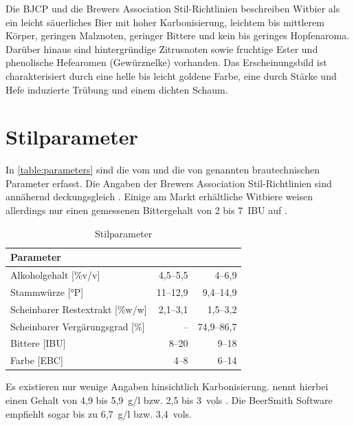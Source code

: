 \documentclass[a4paper,parskip=half]{scrartcl}
\begin{document}
Die BJCP und die Brewers Association Stil-Richtlinien beschreiben
Witbier als ein leicht säuerliches Bier mit hoher Karbonisierung,
leichtem bis mittlerem Körper, geringen Malznoten, geringer Bittere
und kein bis geringes Hopfenaroma. Darüber hinaus sind hintergründige
Zitrusnoten sowie fruchtige Ester und phenolische Hefearomen (Gewürznelke)
vorhanden. Das Erscheinungsbild ist charakterisiert durch eine helle
bis leicht goldene Farbe, eine durch Stärke und Hefe induzierte Trübung
und einem dichten Schaum. \parencites[48\psq]{BJCP2015}[24]{BA2021}

\section*{Stilparameter}

In \autoref{table:parameters} sind die vom \citeauthor{BJCP2015} und die von
\citeauthor{Strottner1999} genannten brautechnischen Parameter erfasst.
Die Angaben der Brewers Association Stil-Richtlinien sind annähernd
deckungsgleich \parencites[24]{BA2021}. Einige am Markt erhältliche
Witbiere weisen allerdings nur einen gemessenen Bittergehalt von
2 bis 7~IBU auf \parencite[96-121]{Roncoroni2018}.

\begin{table}[H]
\centering
\begin{tabular}{lrr}
\toprule
Parameter                       & \citeauthor{BJCP2015} & \citeauthor{Strottner1999} \\
\midrule
Alkoholgehalt [\%v/v]           & 4,5–5,5 & 4–6,9 \\
Stammwürze [°P]                 & 11–12,9 & 9,4–14,9 \\
Scheinbarer Restextrakt [\%w/w] & 2,1–3,1 & 1,5–3,2 \\
Scheinbarer Vergärungsgrad [\%] & –       & 74,9–86,7 \\
Bittere [IBU]                   & 8–20    & 9–18 \\
Farbe [EBC]                     & 4–8     & 6–14 \\
\bottomrule
\end{tabular}
\caption{Stilparameter \parencites[49]{BJCP2015}[23-113]{Strottner1999}}
\label{table:parameters}
\end{table}

Es existieren nur wenige Angaben hinsichtlich Karbonisierung.
\citeauthor{Zainasheff2007} nennt hierbei einen  Gehalt von
4,9 bis 5,9~g/l bzw. 2,5 bis 3~vols \parencite{Zainasheff2007}.
Die BeerSmith Software empfiehlt sogar bis zu 6,7~g/l bzw. 3,4~vols.
\end{document}
